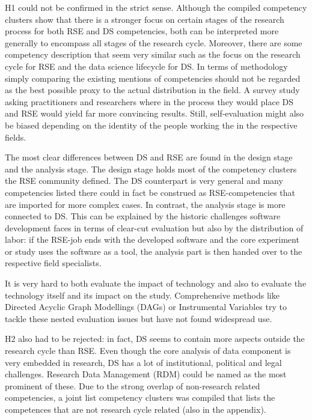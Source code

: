 \documentclass[
        english,biblatex
    ]{lni}
\begin{document}
    H1 could not be confirmed in the strict sense. Although the compiled
    competency clusters show that there is a stronger focus on certain
    stages of the research process for both RSE and DS competencies,
    both can be interpreted more generally to encompass all stages of
    the research cycle. Moreover, there are some competency description
    that seem very similar such as the focus on the research cycle for
    RSE and the data science lifecycle for DS. In terms of methodology
    simply comparing the existing mentions of competencies should not be
    regarded as the best possible proxy to the actual distribution in
    the field. A survey study asking practitioners and researchers where
    in the process they would place DS and RSE would yield far more
    convincing results. Still, self-evaluation might also be biased
    depending on the identity of the people working the in the
    respective fields.

    The most clear differences between DS and RSE are found in the
    design stage and the analysis stage. The design stage holds most of
    the competency clusters the RSE community defined. The DS
    counterpart is very general and many competencies listed there could
    in fact be construed as RSE-competencies that are imported for more
    complex cases. In contrast, the analysis stage is more connected to
    DS. This can be explained by the historic challenges software
    development faces in terms of clear-cut evaluation but also by the
    distribution of labor: if the RSE-job ends with the developed
    software and the core experiment or study uses the software as a
    tool, the analysis part is then handed over to the respective field
    specialists.

    It is very hard to both evaluate the impact of technology and also
    to evaluate the technology itself and its impact on the study.
    Comprehensive methods like Directed Acyclic Graph Modellings (DAGs)
    or Instrumental Variables try to tackle these nested evaluation
    issues but have not found widespread use.

    H2 also had to be rejected: in fact, DS seems to contain more
    aspects outside the research cycle than RSE. Even though the core
    analysis of data component is very embedded in research, DS has a
    lot of institutional, political and legal challenges. Research Data
    Management (RDM) could be named as the most prominent of these. Due
    to the strong overlap of non-research related competencies, a joint
    list competency clusters was compiled that lists the competences
    that are not research cycle related (also in the appendix).
\end{document}
